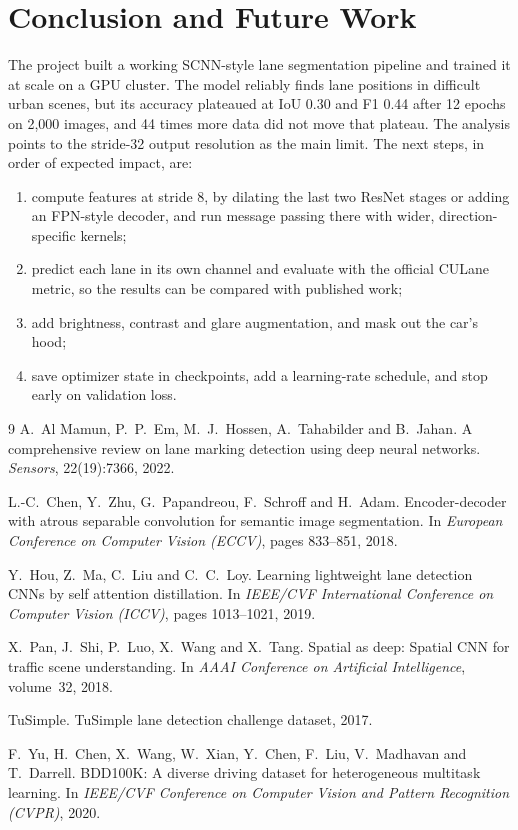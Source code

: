 \documentclass[11pt]{article}
\begin{document}
\section{Conclusion and Future Work}

The project built a working SCNN-style lane segmentation pipeline and trained it at scale on a GPU
cluster. The model reliably finds lane positions in difficult urban scenes, but its accuracy
plateaued at IoU 0.30 and F1 0.44 after 12 epochs on 2{,}000 images, and 44 times more data did not
move that plateau. The analysis points to the stride-32 output resolution as the main limit. The next
steps, in order of expected impact, are:
\begin{enumerate}
  \item compute features at stride 8, by dilating the last two ResNet stages or adding an FPN-style
        decoder, and run message passing there with wider, direction-specific kernels;
  \item predict each lane in its own channel and evaluate with the official CULane metric, so the
        results can be compared with published work;
  \item add brightness, contrast and glare augmentation, and mask out the car's hood;
  \item save optimizer state in checkpoints, add a learning-rate schedule, and stop early on
        validation loss.
\end{enumerate}

\begin{thebibliography}{9}
\small
{} A.~Al Mamun, P.~P.~Em, M.~J.~Hossen, A.~Tahabilder and B.~Jahan. A comprehensive
review on lane marking detection using deep neural networks. \emph{Sensors}, 22(19):7366, 2022.

 L.-C.~Chen, Y.~Zhu, G.~Papandreou, F.~Schroff and H.~Adam. Encoder-decoder with
atrous separable convolution for semantic image segmentation. In \emph{European Conference on
Computer Vision (ECCV)}, pages 833--851, 2018.

 Y.~Hou, Z.~Ma, C.~Liu and C.~C.~Loy. Learning lightweight lane detection CNNs by
self attention distillation. In \emph{IEEE/CVF International Conference on Computer Vision (ICCV)},
pages 1013--1021, 2019.

 X.~Pan, J.~Shi, P.~Luo, X.~Wang and X.~Tang. Spatial as deep: Spatial CNN for
traffic scene understanding. In \emph{AAAI Conference on Artificial Intelligence}, volume~32, 2018.

 TuSimple. TuSimple lane detection challenge dataset, 2017.

 F.~Yu, H.~Chen, X.~Wang, W.~Xian, Y.~Chen, F.~Liu, V.~Madhavan and T.~Darrell.
BDD100K: A diverse driving dataset for heterogeneous multitask learning. In \emph{IEEE/CVF Conference
on Computer Vision and Pattern Recognition (CVPR)}, 2020.
\end{thebibliography}
\end{document}
